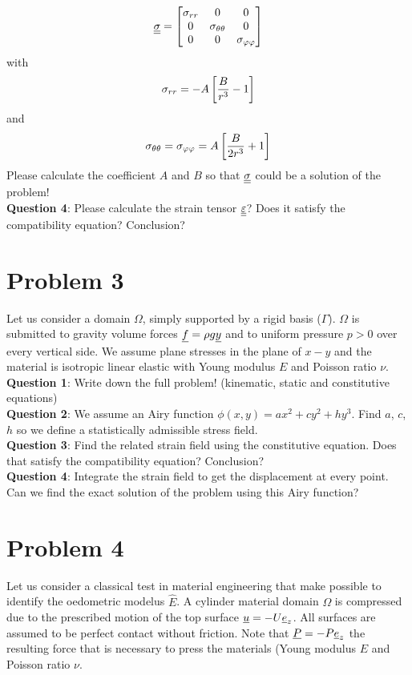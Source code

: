 \documentclass[letter,12pt]{article}
\begin{document}
\begin{equation}
\underline{\underline{\sigma}} = \left[ \begin{matrix}
\sigma_{rr} &0 &0 \\
0 & \sigma_{\theta\theta} & 0 \\
0 & 0 & \sigma_{\varphi\varphi}
\end{matrix} \right]
\end{equation}
with 
\begin{equation}
\sigma_{rr} = -A\left[\frac{B}{r^3} - 1 \right]
\end{equation}
and 
\begin{equation}
\sigma_{\theta\theta} = \sigma_{\varphi\varphi} = A \left[\frac{B}{2r^3} + 1 \right]
\end{equation}
 Please calculate the coefficient $A$ and $B$ so that $\underline{\underline{\sigma}}$ could be a solution of the problem! \\

\noindent \textbf{Question 4}: Please calculate the strain tensor $\underline{\underline{\varepsilon}}$? Does it satisfy the compatibility equation? Conclusion?

\section{Problem 3}
Let us consider a domain $\Omega$, simply supported by a rigid basis ($\Gamma$). $\Omega$ is submitted to gravity volume forces $\underline{f} = \rho g \underline{y} $ and to uniform pressure $p > 0$ over every vertical side. We assume plane stresses in the plane of $x-y$ and the material is isotropic linear elastic with Young modulus $E$ and Poisson ratio $\nu$. \\

\noindent \textbf{Question 1}: Write down the full problem! (kinematic, static and constitutive equations) \\

\noindent \textbf{Question 2}: We assume an Airy function $\phi(x,y) = ax^2 + cy^2 + h y^3$. Find $a$, $c$, $h$ so we define a statistically admissible stress field. \\

\noindent \textbf{Question 3}: Find the related strain field using the constitutive equation. Does that satisfy the compatibility equation? Conclusion? \\

\noindent \textbf{Question 4}: Integrate the strain field to get the displacement at every point. Can we find the exact solution of the problem using this Airy function?

\section{Problem 4}
Let us consider a classical test in material engineering that make possible to identify the oedometric  modelus $\hat{E}$. A cylinder material domain $\Omega$ is compressed due to the prescribed motion of the top surface $\underline{u} = -U \underline{e}_z $. All surfaces are assumed to be perfect contact without friction. Note that $\underline{P} = -P \underline{e}_z$ the resulting force that is necessary to press the materials (Young modulus $E$ and Poisson ratio $\nu$. \\
\end{document}
